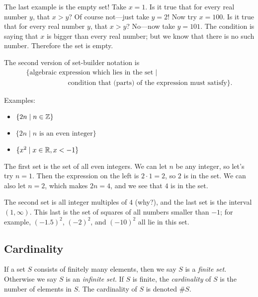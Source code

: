 \documentclass{tufte-book}
\begin{document}
The last example is the empty set! Take $x = 1$. Is it true that for every real number $y$, that $x > y$? Of course not---just take $y = 2$! Now try $x = 100$. Is it true that for every real number $y$, that $x > y$? No---now take $y = 101$. The condition is saying that $x$ is bigger than every real number; but we know that there is no such number. Therefore the set is empty.

The second version of set-builder notation is
\begin{gather*}
  \{ \text{algebraic expression which lies in the set} \mid \\
  \qquad \qquad \qquad \text{condition that (parts) of the expression must satisfy}\}.
\end{gather*}

Examples:
\begin{itemize}
    \item $\{2n \mid n \in \mathbb{Z}\}$
    \item $\{2n \mid n \text{ is an even integer}\}$
    \item $\{x^2 \mid x \in \mathbb{R}, x < -1\}$
\end{itemize}
The first set is the set of all even integers. We can let $n$ be any integer, so let's try $n = 1$. Then the expression on the left is $2 \cdot 1 = 2$, so $2$ is in the set. We can also let $n = 2$, which makes $2n = 4$, and we see that $4$ is in the set. 

The second set is all integer multiples of $4$ (why?), and the last set is the interval $(1, \infty)$. This last is the set of squares of all numbers smaller than $-1$; for example, $(-1.5)^2$, $(-2)^2$, and $(-10)^2$ all lie in this set.


\subsection{Cardinality}
\label{sec:cardinality}

\begin{definition}
  If a set $S$ consists of finitely many elements, then we say $S$ is a \emph{finite set}. Otherwise we say $S$ is an \emph{infinite set}. If $S$ is finite, the \emph{cardinality} of $S$ is the number of elements in $S$. The cardinality of $S$ is denoted $\# S$.
\end{definition}
\end{document}
